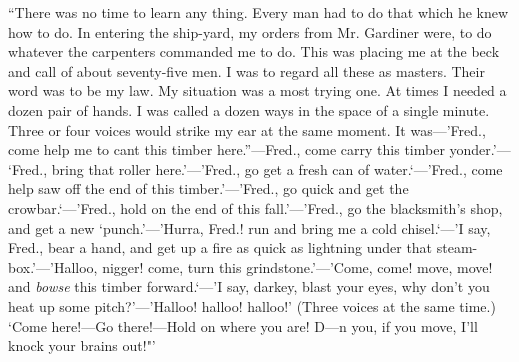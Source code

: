 {``There was no time to learn any thing. Every man had to do that which
he knew how to do. In entering the ship-yard, my orders from Mr.
Gardiner were, to do whatever the carpenters commanded me to do. This
was placing me at the beck and call of about seventy-five men. I was to
regard all these as masters. Their word was to be my law. My situation
was a most trying one. At times I needed a dozen pair of hands. I was
called a dozen ways in the space of a single minute. Three or four
voices would strike my ear at the same moment. It was---'Fred., come
help me to cant this timber here.''---Fred., come carry this timber
yonder.'---} {}{`Fred., bring that roller here.'---'Fred., go get a
fresh can of water.`---'Fred., come help saw off the end of this
timber.'---'Fred., go quick and get the crowbar.`---'Fred., hold on the
end of this fall.'---'Fred., go the blacksmith's shop, and get a new
`punch.'---'Hurra, Fred.! run and bring me a cold chisel.`---'I say,
Fred., bear a hand, and get up a fire as quick as lightning under that
steam-box.'---'Halloo, nigger! come, turn this grindstone.'---'Come,
come! move, move! and \emph{bowse} this timber forward.`---'I say,
darkey, blast your eyes, why don't you heat up some pitch?'---'Halloo!
halloo! halloo!' (Three voices at the same time.) `Come here!---Go
there!---Hold on where you are! D---n you, if you move, I'll knock your
brains out!"'}

